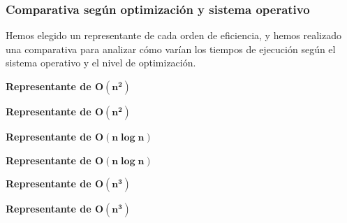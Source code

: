 \documentclass[spanish]{beamer}
\begin{document}
\begin{frame}
\frametitle{Comparativa según optimización y sistema operativo}

 Hemos elegido un representante de cada orden de eficiencia, y hemos realizado una comparativa para analizar cómo varían los tiempos de ejecución según el sistema operativo y el nivel de optimización.	
\end{frame}
	
\begin{frame}
\vspace{2em}
\textbf{Representante de $\boldsymbol{O(n^2)}$}
	\begin{center}
		
	\end{center}
\end{frame}

\begin{frame}
\vspace{2em}
\textbf{Representante de $\boldsymbol{O(n^2)}$}
	\begin{center}
		
	\end{center}
\end{frame}

\begin{frame}
\vspace{2em}
\textbf{Representante de $\boldsymbol{O(n\log n)}$}
	\begin{center}
		
	\end{center}
\end{frame}

\begin{frame}
\vspace{2em}
\textbf{Representante de $\boldsymbol{O(n\log n)}$}
	\begin{center}
		
	\end{center}
\end{frame}

\begin{frame}
\vspace{2em}
\textbf{Representante de $\boldsymbol{O(n^3)}$}
	\begin{center}
		
	\end{center}
\end{frame}

\begin{frame}
\vspace{2em}
\textbf{Representante de $\boldsymbol{O(n^3)}$}
	\begin{center}
		
	\end{center}
\end{frame}
\end{document}
